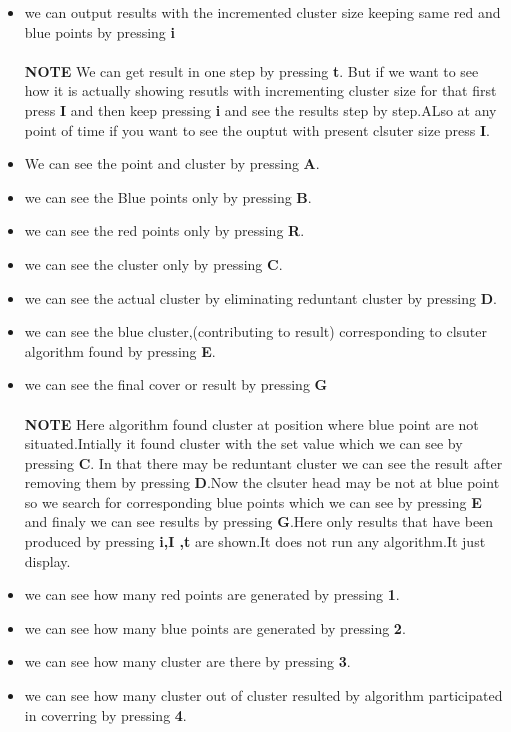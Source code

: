\documentclass[a4paper,10pt]{report}
\begin{document}
\begin{itemize}
 \item we can output results with the incremented cluster size keeping same red and blue points by pressing \textbf{i}\\ \\
 \textbf{NOTE} We can get result in one step by pressing \textbf{t}. But if we want to see how it is actually showing
 resutls with incrementing cluster size for that first press \textbf{I} and then keep pressing \textbf{i} and see the
 results step by step.ALso at any point of time if you want to see the ouptut with present clsuter size press \textbf{I}.
 \item We can see the point and cluster by pressing \textbf{A}.
 \item we can see the Blue points only by pressing \textbf{B}.
 \item we can see the red points only by pressing \textbf{R}.
 \item we can see the cluster only by pressing \textbf{C}.
 \item we can see the actual cluster by eliminating reduntant cluster by pressing \textbf{D}.
 \item we can see the blue cluster,(contributing to result) corresponding to clsuter algorithm found by pressing \textbf{E}.
 \item we can see the final cover or result by pressing \textbf{G} \\ \\
 \textbf{NOTE} Here algorithm found cluster at position where blue point are not situated.Intially it found cluster with 
 the set value which we can see by pressing \textbf{C}. In that there may be reduntant cluster we can see the result after
 removing them by pressing \textbf{D}.Now the clsuter head may be not at blue point so we search for corresponding blue points 
 which we can see by pressing \textbf{E} and finaly we can see results by pressing \textbf{G}.Here only results that have
 been produced by pressing \textbf{i,I ,t} are shown.It does not run any algorithm.It just display.
 \item we can see how many red points are generated by pressing \textbf{1}.
 \item we can see how many blue points are generated by pressing \textbf{2}.
 \item we can see how many cluster are there by pressing \textbf{3}.
 \item we can see how many cluster out of cluster resulted by algorithm participated in coverring by pressing \textbf{4}.

\end{itemize}
\end{document}

